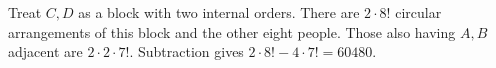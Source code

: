 Treat $C,D$ as a block with two internal orders. There are $2\cdot8!$ circular arrangements of this block and the other eight people. Those also having $A,B$ adjacent are $2\cdot2\cdot7!$. Subtraction gives $2\cdot8!-4\cdot7!=\boxed{60480}$.
